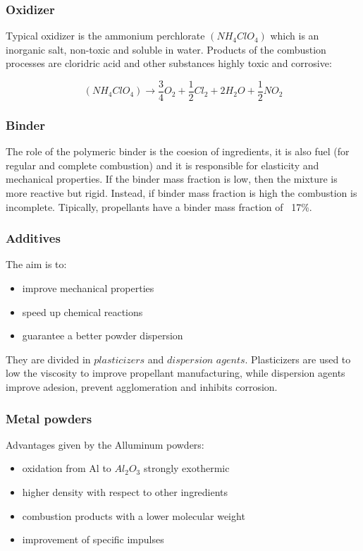\documentclass[12pt]{article}
\begin{document}
\subsubsection{Oxidizer}


Typical oxidizer is the ammonium perchlorate $(NH_{4}ClO_{4})$ which is an inorganic salt, non-toxic and soluble in water. Products of the combustion processes are cloridric acid and other substances highly toxic and corrosive:

\begin{equation}
  (NH_{4}ClO_{4}) \rightarrow \frac{3}{4}O_{2} + \frac{1}{2}Cl_{2} + 2H_{2}O + \frac{1}{2}NO_{2}
\end{equation}

\subsubsection{Binder}

The role of the polymeric binder is the coesion of ingredients, it is also fuel (for regular and complete combustion) and it is responsible for elasticity and mechanical properties. If the binder mass fraction is low, then the mixture is more reactive but rigid. Instead, if binder mass fraction is high the combustion is incomplete. Tipically, propellants have a binder mass fraction of ~17\%.

\subsubsection{Additives}

The aim is to:
\begin{itemize}
  \item improve mechanical properties
  \item speed up chemical reactions
  \item guarantee a better powder dispersion
\end{itemize}

They are divided in $\textit{plasticizers}$ and $\textit{dispersion agents}$. Plasticizers are used to low the viscosity to improve propellant manufacturing, while dispersion agents improve adesion, prevent agglomeration and inhibits corrosion.

\subsubsection{Metal powders}

Advantages given by the Alluminum powders:
\begin{itemize}
  \item oxidation from Al to $Al_{2}O_{3}$ strongly exothermic
  \item higher density with respect to other ingredients
  \item combustion products with a lower molecular weight
  \item improvement of specific impulses
\end{itemize}
\end{document}
